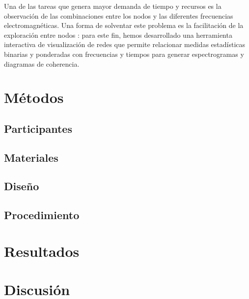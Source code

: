 \documentclass[jou]{apa6}
\begin{document}
Una de las tareas que genera mayor demanda de tiempo y recursos es la observación de las combinaciones entre los nodos
y las diferentes frecuencias electromagnéticas. Una forma de solventar este problema es la facilitación de la 
exploración entre nodos \parencite{Massimini2228}: para este fin, hemos desarrollado una herramienta interactiva 
de visualización de redes que permite relacionar medidas estadísticas binarias y ponderadas con frecuencias y 
tiempos para generar espectrogramas y diagramas de coherencia.

\section{Métodos}
\subsection{Participantes}
\subsection{Materiales}
\subsection{Diseño}
\subsection{Procedimiento}

\section{Resultados}

\section{Discusión}

\printbibliography
\end{document}
